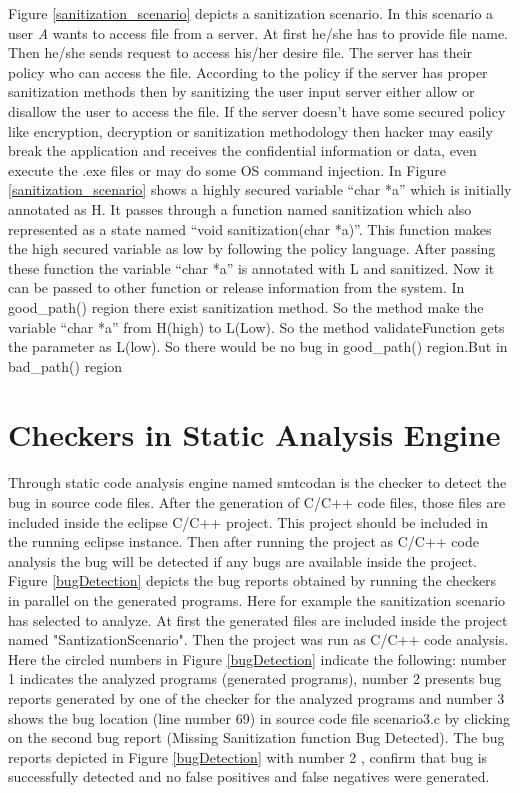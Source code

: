  Figure \ref{sanitization_scenario} depicts a sanitization scenario. In this scenario a user \emph{A} wants to access file from a server. At first he/she has to provide file name. Then he/she sends request to access his/her desire file. The server has their policy who can access the file. According to the policy if the server has proper sanitization methods then by sanitizing the user input server either allow or disallow the user to access the file. If the server doesn't have some secured policy like encryption, decryption or sanitization methodology then hacker may easily break the application and receives the confidential information or data, even execute the .exe files or may do some OS command injection. In Figure \ref{sanitization_scenario} shows a highly secured variable \enquote{char *a} which is initially annotated as H. It passes through a function named sanitization which also represented as a state named \enquote{void sanitization(char *a)}. This function makes the high secured variable as low by following the policy language. After passing these function the variable \enquote{char *a} is annotated with L and sanitized. Now it can be passed to other function or release information from the system. In good\_path() region there exist sanitization method. So the method make the variable \enquote{char *a} from H(high) to L(Low). So the method validateFunction gets the parameter as L(low). So there would be no bug in good\_path() region.But in bad\_path() region 



\section{Checkers in Static Analysis Engine}
Through static code analysis engine named smtcodan is the checker to detect the bug in source code files. After the generation of C/C++ code files, those files are included inside the eclipse C/C++ project. This project should be included in the running eclipse instance. Then after running the project as C/C++ code analysis the bug will be detected if any bugs are available inside the project. Figure \ref{bugDetection} depicts the bug reports obtained by running the checkers in parallel on the generated programs. Here for example the sanitization scenario has selected to analyze. At first the generated files are included inside the project named "SantizationScenario". Then the project was run as C/C++ code analysis. Here the circled numbers in Figure \ref{bugDetection} indicate the following: number 1 indicates the analyzed programs (generated programs), number
2 presents bug reports generated by one of the checker for the analyzed programs and number 3 shows the
bug location (line number 69) in source code file scenario3.c by
clicking on the second bug report (Missing Sanitization function Bug
Detected). The bug reports depicted in Figure \ref{bugDetection} with number
2 , confirm that bug is successfully detected and no
false positives and false negatives were generated.

